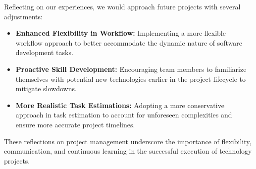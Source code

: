 \documentclass{article}
\begin{document}
Reflecting on our experiences, we would approach future projects with several adjustments:

\begin{itemize}
    \item \textbf{Enhanced Flexibility in Workflow:} Implementing a more flexible workflow approach to better accommodate the dynamic nature of software development tasks.
    \item \textbf{Proactive Skill Development:} Encouraging team members to familiarize themselves with potential new technologies earlier in the project lifecycle to mitigate slowdowns.
    \item \textbf{More Realistic Task Estimations:} Adopting a more conservative approach in task estimation to account for unforeseen complexities and ensure more accurate project timelines.
\end{itemize}

These reflections on project management underscore the importance of flexibility, communication, and continuous learning in the successful execution of technology projects.
\end{document}

